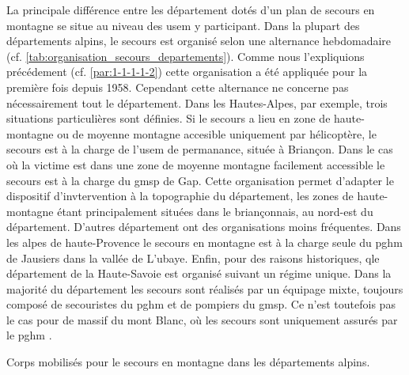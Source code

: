 La principale différence entre les département dotés d'un plan de
secours en montagne se situe au niveau des \ac{usem} y
participant. Dans la plupart des départements alpins, le secours est
organisé selon une alternance hebdomadaire
(cf. \autoref{tab:organisation_secours_departements}). Comme nous
l'expliquions précédement (cf. \ref{par:1-1-1-1-2}) cette organisation
a été appliquée pour la première fois depuis 1958. Cependant cette
alternance ne concerne pas nécessairement tout le département. Dans
les Hautes-Alpes, par exemple, trois situations particulières sont
définies. Si le secours a lieu en zone de haute-montagne ou de moyenne
montagne accesible uniquement par hélicoptère, le secours est à la
charge de l'\ac{usem} de permanance, située à Briançon. Dans le cas où
la victime est dans une zone de moyenne montagne facilement accessible
le secours est à la charge du \ac{gmsp} de Gap. Cette organisation
permet d'adapter le dispositif d'invtervention à la topographie du
département, les zones de haute-montagne étant principalement situées
dans le briançonnais, au nord-est du département. D'autres département
ont des organisations moins fréquentes. Dans les alpes de
haute-Provence le secours en montagne est à la charge seule du
\ac{pghm} de Jausiers dans la vallée de L'ubaye. Enfin, pour des
raisons historiques, qle département de la Haute-Savoie est organisé
suivant un régime unique.  Dans la majorité du département les secours
sont réalisés par un équipage mixte, toujours composé de secouristes
du \ac{pghm} et de pompiers du \ac{gmsp}. Ce n'est toutefois pas le
cas pour de massif du mont Blanc, où les secours sont uniquement
assurés par le \ac{pghm} \autocite{Halle2007,Boillot2017}.

\begin{table}
  \centering
  
  \caption{Corps mobilisés pour le secours en montagne dans les
    départements alpins.}
  \label{tab:organisation_secours_departements}
\end{table}

